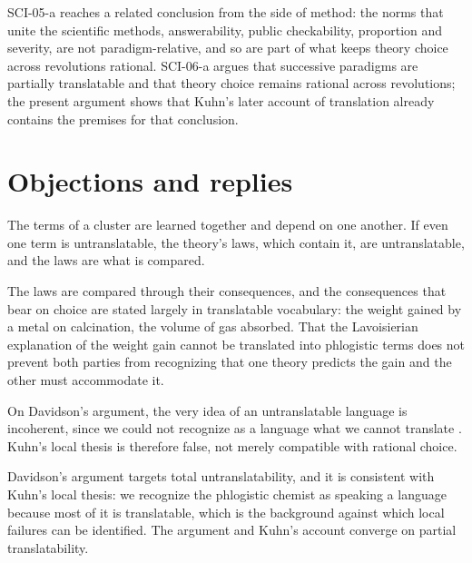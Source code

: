 \documentclass{situationist-preprint}
\begin{document}
SCI-05-a reaches a related conclusion from the side of method: the norms that unite the scientific methods, answerability, public checkability, proportion and severity, are not paradigm-relative, and so are part of what keeps theory choice across revolutions rational. SCI-06-a argues that successive paradigms are partially translatable and that theory choice remains rational across revolutions; the present argument shows that Kuhn's later account of translation already contains the premises for that conclusion.

\section{Objections and replies}\label{s:objections}

\begin{objection}[Holism]
The terms of a cluster are learned together and depend on one another. If even one term is untranslatable, the theory's laws, which contain it, are untranslatable, and the laws are what is compared.
\end{objection}

\begin{reply}
The laws are compared through their consequences, and the consequences that bear on choice are stated largely in translatable vocabulary: the weight gained by a metal on calcination, the volume of gas absorbed. That the Lavoisierian explanation of the weight gain cannot be translated into phlogistic terms does not prevent both parties from recognizing that one theory predicts the gain and the other must accommodate it.
\end{reply}

\begin{objection}[Davidson]
On Davidson's argument, the very idea of an untranslatable language is incoherent, since we could not recognize as a language what we cannot translate \citep{Davidson1974}. Kuhn's local thesis is therefore false, not merely compatible with rational choice.
\end{objection}

\begin{reply}
Davidson's argument targets total untranslatability, and it is consistent with Kuhn's local thesis: we recognize the phlogistic chemist as speaking a language because most of it is translatable, which is the background against which local failures can be identified. The argument and Kuhn's account converge on partial translatability.
\end{reply}
\end{document}
